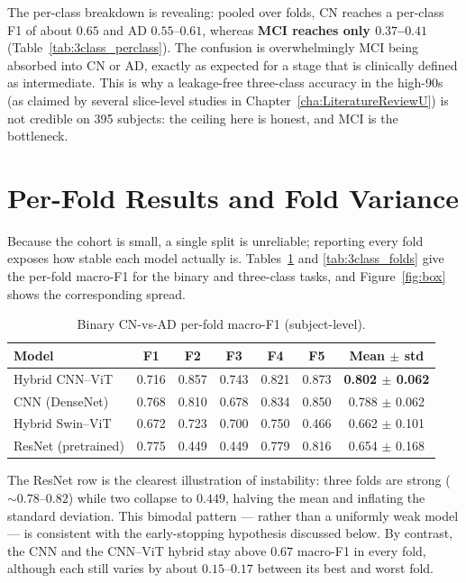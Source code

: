The per-class breakdown is revealing: pooled over folds, CN reaches a per-class F1 of about $0.65$ and AD $0.55$--$0.61$, whereas \textbf{MCI reaches only $0.37$--$0.41$} (Table~\ref{tab:3class_perclass}). The confusion is overwhelmingly MCI being absorbed into CN or AD, exactly as expected for a stage that is clinically defined as intermediate. This is why a leakage-free three-class accuracy in the high-90s (as claimed by several slice-level studies in Chapter~\ref{cha:LiteratureReviewU}) is not credible on 395 subjects: the ceiling here is honest, and MCI is the bottleneck.

\section{Per-Fold Results and Fold Variance}
Because the cohort is small, a single split is unreliable; reporting every fold exposes how stable each model actually is. Tables~\ref{tab:binary_folds} and \ref{tab:3class_folds} give the per-fold macro-F1 for the binary and three-class tasks, and Figure~\ref{fig:box} shows the corresponding spread.

\begin{table}[H]
\centering
\caption{Binary CN-vs-AD per-fold macro-F1 (subject-level).}
\label{tab:binary_folds}
\begin{tabular}{|l|c|c|c|c|c|c|}
\hline
\textbf{Model} & \textbf{F1} & \textbf{F2} & \textbf{F3} & \textbf{F4} & \textbf{F5} & \textbf{Mean $\pm$ std} \\
\hline
Hybrid CNN--ViT & 0.716 & 0.857 & 0.743 & 0.821 & 0.873 & \textbf{0.802 $\pm$ 0.062} \\
CNN (DenseNet) & 0.768 & 0.810 & 0.678 & 0.834 & 0.850 & 0.788 $\pm$ 0.062 \\
Hybrid Swin--ViT & 0.672 & 0.723 & 0.700 & 0.750 & 0.466 & 0.662 $\pm$ 0.101 \\
ResNet (pretrained) & 0.775 & 0.449 & 0.449 & 0.779 & 0.816 & 0.654 $\pm$ 0.168 \\
\hline
\end{tabular}
\end{table}

The ResNet row is the clearest illustration of instability: three folds are strong ($\sim\!0.78$--$0.82$) while two collapse to $0.449$, halving the mean and inflating the standard deviation. This bimodal pattern --- rather than a uniformly weak model --- is consistent with the early-stopping hypothesis discussed below. By contrast, the CNN and the CNN--ViT hybrid stay above $0.67$ macro-F1 in every fold, although each still varies by about $0.15$--$0.17$ between its best and worst fold.

